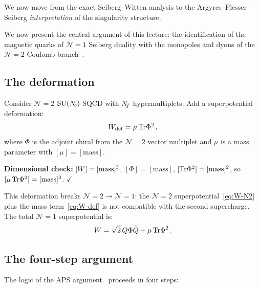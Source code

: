 \documentclass[11pt,a4paper]{article}
\begin{document}
We now move from the exact Seiberg--Witten analysis to the Argyres--Plesser--Seiberg \emph{interpretation} of the singularity structure.

We now present the central argument of this lecture: the identification
of the magnetic quarks of $\mathcal{N}=1$ Seiberg duality with the
monopoles and dyons of the $\mathcal{N}=2$ Coulomb
branch~\cite{APS1996}.

\subsection{The deformation}

Consider $\mathcal{N}=2$ $\mathrm{SU}(N_{\!c})$ SQCD with $N_{\!f}$ hypermultiplets.
Add a superpotential deformation:
\begin{equation}\label{eq:W-def}
  W_{\mathrm{def}} = \mu\,\mathrm{Tr}\Phi^2\,,
\end{equation}
where $\Phi$ is the adjoint chiral from the $\mathcal{N}=2$ vector
multiplet and $\mu$ is a mass parameter with $[\mu] = [\mathrm{mass}]$.

\textbf{Dimensional check:} $[W] = [\mathrm{mass}]^3$, $[\Phi] =
[\mathrm{mass}]$, $[\mathrm{Tr}\Phi^2] = [\mathrm{mass}]^2$, so
$[\mu\,\mathrm{Tr}\Phi^2] = [\mathrm{mass}]^3$.
\quad$\checkmark$

This deformation breaks $\mathcal{N}=2 \to \mathcal{N}=1$: the
$\mathcal{N}=2$ superpotential~\eqref{eq:W-N2} plus the mass
term~\eqref{eq:W-def} is not compatible with the second supercharge.
The total $\mathcal{N}=1$ superpotential is:
\begin{equation}\label{eq:W-total}
  W = \sqrt{2}\, Q\Phi\widetilde{Q} + \mu\,\mathrm{Tr}\Phi^2\,.
\end{equation}

\subsection{The four-step argument}

The logic of the APS argument~\cite{APS1996} proceeds in four steps:
\end{document}
